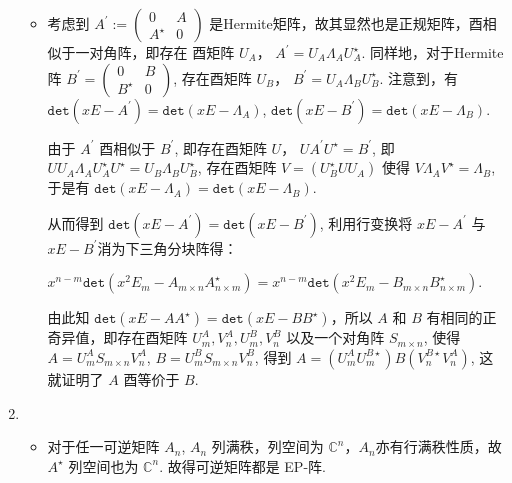 \documentclass{article}
\begin{document}
\begin{spacing}{1.5}
\begin{enumerate}
\begin{itemize}
            \item [$\Leftarrow$:]
            
            考虑到 $A^\prime := \left(\begin{array}{cc}0&A\\A^\star&0\end{array}\right)$ 是Hermite矩阵，故其显然也是正规矩阵，酉相似于一对角阵，即存在 酉矩阵 $U_A$，
            $A^\prime = U_A \Lambda_A U_A^\star$. 同样地，对于Hermite阵 $B^\prime = \left(\begin{array}{cc}0&B\\B^\star&0\end{array}\right)$, 存在酉矩阵 $U_B$，
            $B^\prime = U_A \Lambda_B U_B^\star$. 注意到，有 $\mathtt{det}(xE - A^\prime) = \mathtt{det}(xE - \Lambda_A)$, $\mathtt{det}(xE - B^\prime) = \mathtt{det}(xE - \Lambda_B)$.
            
            由于 $A^\prime$ 酉相似于 $B^\prime$, 即存在酉矩阵 $U$， $UA^\prime U^\star = B^\prime$, 即 $UU_A\Lambda_AU_A^\star U^\star = U_B\Lambda_BU_B^\star$, 存在酉矩阵 
            $V = (U_B^\star UU_A)$ 使得 $V\Lambda_A V^\star = \Lambda_B$, 于是有 $\mathtt{det}(xE - \Lambda_A) = \mathtt{det}(xE - \Lambda_B)$.
            
            从而得到 $\mathtt{det}(xE - A^\prime) = \mathtt{det}(xE - B^\prime)$, 利用行变换将 $xE - A^\prime$ 与 $xE-B^\prime$消为下三角分块阵得： 

            $x^{n-m}\mathtt{det}(x^2E_m - A_{m\times n}A^\star_{n\times m}) = x^{n-m}\mathtt{det}(x^2E_m - B_{m\times n}B^\star_{n\times m})$.
            
            由此知 $\mathtt{det}(xE - AA^\star) = \mathtt{det}(xE - BB^\star)$，所以 $A$ 和 $B$ 有相同的正奇异值，即存在酉矩阵 $U^A_m, V^A_n, U^B_m, V^B_n$ 以及一个对角阵 $S_{m\times n}$, 使得 
            $A = U^A_mS_{m\times n}V^A_n$, $B = U^B_mS_{m\times n}V^B_n$, 得到 $A = (U^A_mU^{B\star}_m)B(V^{B\star}_nV^A_n)$, 这就证明了 $A$ 酉等价于 $B$.

        \end{itemize}

        \item [2.5 习题3]
        
        \begin{itemize}
            \item [(1)] 对于任一可逆矩阵 $A_n$, $A_n$ 列满秩，列空间为 $\mathbb{C}^n$，$A_n$亦有行满秩性质，故 $A^\star$ 列空间也为 $\mathbb{C}^n$. 故得可逆矩阵都是 EP-阵.
        

\end{itemize}
\end{enumerate}
\end{spacing}
\end{document}
